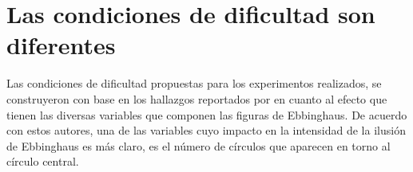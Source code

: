 \begin{itemize}

\end{itemize}








\section{Las condiciones de dificultad son diferentes}

Las condiciones de dificultad propuestas para los experimentos realizados, se construyeron con base en los hallazgos reportados por \parencite{Massaro1971} en cuanto al efecto que tienen las diversas variables que componen las figuras de Ebbinghaus. De acuerdo con estos autores, una de las variables cuyo impacto en la intensidad de la ilusión de Ebbinghaus es más claro, es el número de círculos que aparecen en torno al círculo central.

